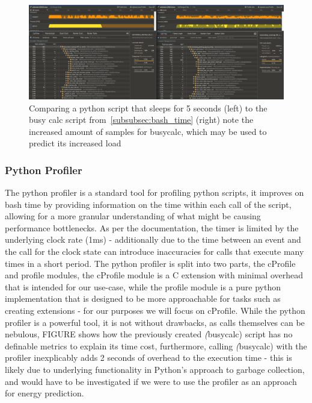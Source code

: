 \begin{figure}[H]
    \centering
    \includegraphics[width=15cm]{figures/introduction/perf_gecko_sleep_vs_calc}
    \caption{Comparing a python script that sleeps for 5 seconds (left) to the busy calc script
    from~\ref{subsubsec:bash_time} (right) note the increased amount of samples for busycalc, which may be used to
    predict its increased load}
    \label{fig:perf_gecko}
\end{figure}

\subsubsection{Python Profiler}
The python profiler\cite{PythonProfiler} is a standard tool for profiling python scripts, it improves on bash time by
providing information on the time within each call of the script, allowing for a more granular understanding of what
might be causing performance bottlenecks.
As per the documentation, the timer is limited by the underlying clock rate (1ms) - additionally due to the time between
an event and the call for the clock state can introduce inaccuracies for calls that execute many times in a short
period.
The python profiler is split into two parts, the cProfile and profile modules, the cProfile module is a C extension with
minimal overhead that is intended for our use-case, while the profile module is a pure python implementation that is
designed to be more approachable for tasks such as creating extensions - for our purposes we will focus on cProfile.
While the python profiler is a powerful tool, it is not without drawbacks, as calls themselves can be nebulous, FIGURE
shows how the previously created \textit(busycalc) script has no definable metrics to explain its time cost,
furthermore, calling \textit(busycalc) with the profiler inexplicably adds 2 seconds of overhead to the execution time
- this is likely due to underlying functionality in Python's approach to garbage collection, and would have to be
investigated if we were to use the profiler as an approach for energy prediction.



